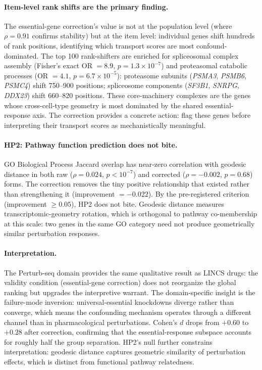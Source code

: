 \documentclass{article}
\begin{document}
\paragraph{Item-level rank shifts are the primary finding.}
The essential-gene correction's value is not at the population level
(where $\rho = 0.91$ confirms stability) but at the item level: individual
genes shift hundreds of rank positions, identifying which transport scores
are most confound-dominated. The top 100 rank-shifters are enriched for
spliceosomal complex assembly (Fisher's exact OR $= 8.9$, $p = 1.3 \times
10^{-7}$) and proteasomal catabolic processes (OR $= 4.1$, $p = 6.7 \times
10^{-5}$): proteasome subunits (\emph{PSMA3}, \emph{PSMB6}, \emph{PSMC4})
shift 750--900 positions; spliceosome components (\emph{SF3B1},
\emph{SNRPG}, \emph{DDX23}) shift 660--820 positions. These core-machinery
complexes are the genes whose cross-cell-type geometry is most dominated by
the shared essential-response axis. The correction provides a concrete
action: flag these genes before interpreting their transport scores as
mechanistically meaningful.

\paragraph{HP2: Pathway function prediction does not bite.}
GO Biological Process Jaccard overlap has near-zero correlation with geodesic
distance in both raw ($\rho = 0.024$, $p < 10^{-7}$) and corrected ($\rho =
-0.002$, $p = 0.68$) forms. The correction removes the tiny positive
relationship that existed rather than strengthening it (improvement $=
-0.022$). By the pre-registered criterion (improvement $\geq 0.05$), HP2
does not bite. Geodesic distance measures transcriptomic-geometry rotation,
which is orthogonal to pathway co-membership at this scale: two genes in the
same GO category need not produce geometrically similar perturbation
responses.

\paragraph{Interpretation.}
The Perturb-seq domain provides the same qualitative result as LINCS drugs:
the validity condition (essential-gene correction) does not reorganize the
global ranking but upgrades the interpretive warrant. The domain-specific
insight is the failure-mode inversion: universal-essential knockdowns
diverge rather than converge, which means the confounding mechanism operates
through a different channel than in pharmacological perturbations. Cohen's $d$
drops from $+0.60$ to $+0.28$ after correction, confirming that the
essential-response subspace accounts for roughly half the group separation.
HP2's null further constrains interpretation: geodesic distance captures
geometric similarity of perturbation effects, which is distinct from
functional pathway relatedness.
\end{document}
